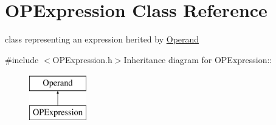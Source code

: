 \hypertarget{classOPExpression}{
\section{OPExpression Class Reference}
\label{classOPExpression}
}


class representing an expression herited by \hyperlink{classOperand}{Operand}  


{\ttfamily \#include $<$OPExpression.h$>$}Inheritance diagram for OPExpression::\begin{figure}[H]
\begin{center}
\leavevmode
\includegraphics[height=2cm]{classOPExpression}
\end{center}
\end{figure}
